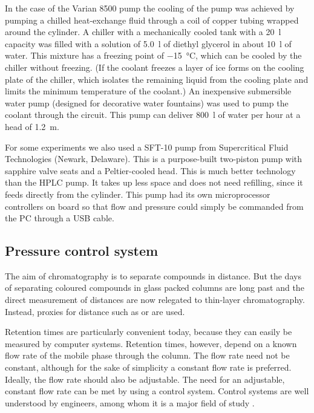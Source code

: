 In the case of the Varian 8500 pump the cooling of the pump was achieved by
pumping a chilled heat-exchange fluid through a coil of copper tubing wrapped
around the cylinder. A chiller with a mechanically cooled tank with a
\SI{20}{\litre} capacity was filled with a solution of \SI{5.0}{\litre} of
diethyl glycerol in about \SI{10}{\litre} of water. This mixture has a freezing
point of \SI{-15}{\celsius}, which can be cooled by the chiller without
freezing. (If the coolant freezes a layer of ice forms on the cooling plate of
the chiller, which isolates the remaining liquid from the cooling plate and
limits the minimum temperature of the coolant.) An inexpensive submersible water
pump (designed for decorative water fountains) was used to pump the coolant
through the circuit. This pump can deliver \SI{800}{\litre} of water per hour at
a head of \SI{1.2}{\metre}.

For some experiments we also used a SFT-10 pump from Supercritical Fluid
Technologies (Newark, Delaware). This is a purpose-built two-piston pump with
sapphire valve seats and a Peltier-cooled head. This is much better technology
than the HPLC pump. It takes up less space and does not need refilling, since it
feeds directly from the cylinder. This pump had its own microprocessor
controllers on board so that flow and pressure could simply be commanded from
the PC through a USB cable.

\subsection{Pressure control system}

The aim of chromatography is to separate compounds in distance.
But the days of separating coloured compounds in glass packed columns are long
past and the direct measurement of distances are now relegated to thin-layer
chromatography. Instead, proxies for distance such as  or  are used.



Retention times are particularly convenient today, because they can easily be
measured by computer systems. Retention times, however, depend on a known flow
rate of the mobile phase through the column. The flow rate need not be
constant, although for the sake of simplicity a constant flow rate is preferred.
Ideally, the flow rate should also be adjustable. The need for an adjustable,
constant flow rate can be met by using a control system. Control systems are
well understood by engineers, among whom it is a major field of study
\autocite{Koenig2009}.


